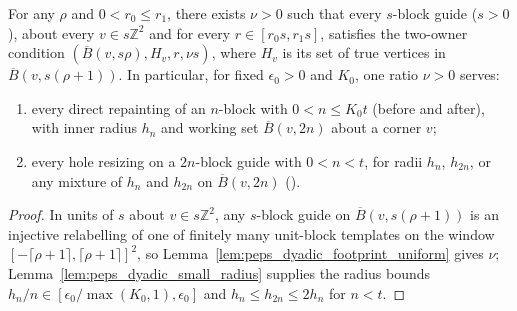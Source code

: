 \begin{lemma}
    \label{thm:peps_dyadic_block_ratio}
    \leanok
    For any $\rho$ and $0<r_0\le r_1$, there exists $\nu>0$ such that every
    $s$-block guide ($s>0$), about every $v\in s\mathbb Z^2$ and for every
    $r\in[r_0s,r_1s]$, satisfies the two-owner condition
    $(\overline B(v,s\rho),H_v,r,\nu s)$, where $H_v$ is its set of true vertices
    in $\overline B(v,s(\rho+1))$. In particular, for fixed $\epsilon_0>0$ and
    $K_0$, one ratio $\nu>0$ serves:
    \begin{enumerate}
        \item every direct repainting of an $n$-block with $0<n\le K_0t$ (before
              and after), with inner radius $h_n$ and working set
              $\overline B(v,2n)$ about a corner $v$;
        \item every hole resizing on a $2n$-block guide with $0<n<t$, for radii
              $h_n$, $h_{2n}$, or any mixture of $h_n$ and $h_{2n}$ on
              $\overline B(v,2n)$
              (\cite[Section~7, lines 515--520, 534--540]{OpenAI2026PolynomialPEPS}).
    \end{enumerate}
\end{lemma}

\begin{proof}\leanok
    In units of $s$ about $v\in s\mathbb Z^2$, any $s$-block guide on
    $\overline B(v,s(\rho+1))$ is an injective relabelling of one of finitely many
    unit-block templates on the window $[-\lceil\rho+1\rceil,\lceil\rho+1\rceil]^2$,
    so Lemma~\ref{lem:peps_dyadic_footprint_uniform} gives $\nu$;
    Lemma~\ref{lem:peps_dyadic_small_radius} supplies the radius bounds
    $h_n/n\in[\epsilon_0/\max(K_0,1),\epsilon_0]$ and
    $h_n\le h_{2n}\le2h_n$ for $n<t$.
\end{proof}

